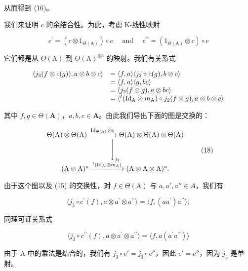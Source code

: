 从而得到 (16)。

我们来证明 \(c\) 的余结合性。为此，考虑 K-线性映射

\[
c ^ {\prime} = \left(c \otimes 1 _ {\Theta (\mathrm{A})}\right) \circ c \quad \text { and } \quad c ^ {\prime \prime} = \left(1 _ {\Theta (\mathrm{A})} \otimes c\right) \circ c
\]

它们都是从 \(\Theta (\mathrm{A})\) 到 \(\Theta (\mathrm{A})^{\otimes 3}\) 的映射。我们有关系式

\[
\begin{array}{r l} \langle j _ {3} (f \otimes c (g)), a \otimes b \otimes c \rangle & = \langle f, a \rangle \langle j _ {2} \circ c (g), b \otimes c \rangle \\ & = \langle f, a \rangle \langle g, b c \rangle \\ & = \langle j _ {2} (f \otimes g), a \otimes b c \rangle \\ & = \langle^ {t} (\mathrm{Id} _ {\mathrm{A}} \otimes m _ {\mathrm{A}}) \circ j _ {2} (f \otimes g), a \otimes b \otimes c \rangle \end{array}
\]

其中 \(f, g \in \Theta(\mathbf{A})\)，\(a, b, c \in \mathbf{A}\)。由此我们导出下面的图是交换的：

\[
\begin{array}{c} \Theta (\mathrm{A}) \otimes \Theta (\mathrm{A}) \xrightarrow {\operatorname{Id} _ {\Theta (\mathrm{A})} \otimes c} \Theta (\mathrm{A}) \otimes \Theta (\mathrm{A}) \otimes \Theta (\mathrm{A}) \\ \Biggl \downarrow_ {j _ {2}} \\ (\mathrm{A} \otimes \mathrm{A}) ^ {*} \xrightarrow {^ t (\operatorname{Id} _ {\mathrm{A}} \otimes m _ {\mathrm{A}})} (\mathrm{A} \otimes \mathrm{A} \otimes \mathrm{A}) ^ {*}. \end{array}\tag{18}
\]

由于这个图以及 (15) 的交换性，对 \(f \in \Theta(\mathrm{A})\) 与 \(a, a', a'' \in A\)，我们有

\[
\langle j _ {3} \circ c ^ {\prime} (f), a \otimes a ^ {\prime} \otimes a ^ {\prime \prime} \rangle = \langle f, (a a ^ {\prime}) a ^ {\prime \prime} \rangle ;
\]

同理可证关系式

\[
\langle j _ {3} \circ c ^ {\prime \prime} (f), a \otimes a ^ {\prime} \otimes a ^ {\prime \prime} \rangle = \langle f, a (a ^ {\prime} a ^ {\prime \prime}) \rangle
\]

由于 A 中的乘法是结合的，我们有 \(j_{3} \circ c' = j_{3} \circ c''\)，因此 \(c' = c''\)，因为 \(j_{3}\) 是单射。

